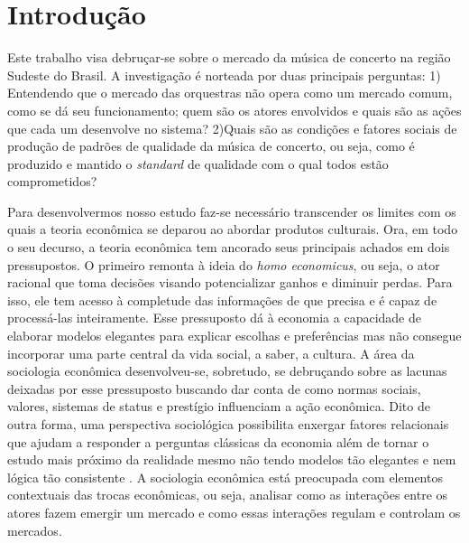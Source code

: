 \documentclass[a4paper, 12pt, openright, oneside, german, french, english, brazil, article]{abntex2}
\begin{document}
\pretextual
\imprimirfolhaderosto

\textual
\section{Introdução}

Este trabalho visa debruçar-se sobre o mercado da música de concerto na região Sudeste do Brasil. A investigação é norteada por duas principais perguntas: 1) Entendendo que o mercado das orquestras não opera como um mercado comum, como se dá seu funcionamento; quem são os atores envolvidos e quais são as ações que cada um desenvolve no sistema? 2)Quais são as condições e fatores sociais de produção de padrões de qualidade da música de concerto, ou seja, como é produzido e mantido o \textit{standard} de qualidade com o qual todos estão comprometidos?

Para desenvolvermos nosso estudo faz-se necessário transcender os limites com os quais a teoria econômica se deparou ao abordar produtos culturais. Ora, em todo o seu decurso, a teoria econômica tem ancorado seus principais achados em dois pressupostos. O primeiro remonta à ideia do \textit{homo economicus}, ou seja, o ator racional que toma decisões visando potencializar ganhos e diminuir perdas. Para isso, ele tem acesso à completude das informações de que precisa e é capaz de processá-las inteiramente. Esse pressuposto dá à economia a capacidade de elaborar modelos elegantes para explicar escolhas e preferências mas não consegue incorporar uma parte central da vida social, a saber, a cultura. A área da sociologia econômica desenvolveu-se, sobretudo, se debruçando sobre as lacunas deixadas por esse pressuposto buscando dar conta de como normas sociais, valores, sistemas de status e prestígio influenciam a ação econômica. Dito de outra forma, uma perspectiva sociológica possibilita enxergar fatores relacionais que ajudam a responder a perguntas clássicas da economia além de tornar o estudo mais próximo da realidade mesmo não tendo modelos tão elegantes e nem lógica tão consistente \cite{hirsch1987dirty}. A sociologia econômica está preocupada com elementos contextuais das trocas econômicas, ou seja, analisar como as interações entre os atores fazem emergir um mercado e como essas interações regulam e controlam os mercados.
\end{document}
